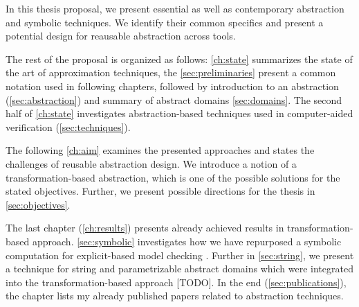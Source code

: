 In this thesis proposal, we present essential as well as contemporary abstraction and symbolic techniques. We identify their common specifics and present a potential design for reausable
abstraction across tools.

The rest of the proposal is organized as follows: \autoref{ch:state} summarizes the state of the art of approximation techniques, the \autoref{sec:preliminaries} present a common notation used in following chapters, followed by introduction to an abstraction (\autoref{sec:abstraction}) and summary of abstract domains \autoref{sec:domains}. The second half of \autoref{ch:state} investigates abstraction-based techniques used in computer-aided verification (\autoref{sec:techniques}).

The following \autoref{ch:aim} examines the presented approaches and states the
challenges of reusable abstraction design. We introduce a notion of a
transformation-based abstraction, which is one of the possible solutions for
the stated objectives. Further, we present possible directions for the thesis
in \autoref{sec:objectives}.

The last chapter (\autoref{ch:results}) presents already achieved results in
transformation-based approach.  \autoref{sec:symbolic} investigates how we
have repurposed a symbolic computation for explicit-based model checking
\cite{Lauko2019Sym, Lauko2018SymComp}. Further in \autoref{sec:string}, we
present a technique for string and parametrizable abstract domains which were
integrated into the transformation-based approach [TODO].  In the end
(\autoref{sec:publications}), the chapter lists my already published papers
related to abstraction techniques.
